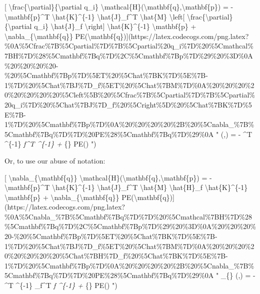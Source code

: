 \documentclass[]{article}
\begin{document}
{[} \textbackslash{}frac\{\textbackslash{}partial\}\{\textbackslash{}partial
q\_i\}
\textbackslash{}mathcal\{H\}(\textbackslash{}mathbf\{q\},\textbackslash{}mathbf\{p\})
= - \textbackslash{}mathbf\{p\}\^{}T \textbackslash{}hat\{K\}\^{}\{-1\}
\textbackslash{}hat\{J\}\_f\^{}T \textbackslash{}hat\{M\}
\textbackslash{}left{[}
\textbackslash{}frac\{\textbackslash{}partial\}\{\textbackslash{}partial q\_i\}
\textbackslash{}hat\{J\}\_f \textbackslash{}right{]}
\textbackslash{}hat\{K\}\^{}\{-1\} \textbackslash{}mathbf\{p\} +
\textbackslash{}nabla\_\{\textbackslash{}mathbf\{q\}\}
PE(\textbackslash{}mathbf\{q\}){]}(https://latex.codecogs.com/png.latex?\%0A\%5Cfrac\%7B\%5Cpartial\%7D\%7B\%5Cpartial\%20q\_i\%7D\%20\%5Cmathcal\%7BH\%7D\%28\%5Cmathbf\%7Bq\%7D\%2C\%5Cmathbf\%7Bp\%7D\%29\%20\%3D\%0A\%20\%20\%20\%20-\%20\%5Cmathbf\%7Bp\%7D\%5ET\%20\%5Chat\%7BK\%7D\%5E\%7B-1\%7D\%20\%5Chat\%7BJ\%7D\_f\%5ET\%20\%5Chat\%7BM\%7D\%0A\%20\%20\%20\%20\%20\%20\%20\%20\%5Cleft\%5B\%20\%5Cfrac\%7B\%5Cpartial\%7D\%7B\%5Cpartial\%20q\_i\%7D\%20\%5Chat\%7BJ\%7D\_f\%20\%5Cright\%5D\%20\%5Chat\%7BK\%7D\%5E\%7B-1\%7D\%20\%5Cmathbf\%7Bp\%7D\%0A\%20\%20\%20\%20\%2B\%20\%5Cnabla\_\%7B\%5Cmathbf\%7Bq\%7D\%7D\%20PE\%28\%5Cmathbf\%7Bq\%7D\%29\%0A
"  (,) = -
\^{}T \^{}\{-1\} \emph{f\^{}T 
 \^{}\{-1\}
 + \nabla}\{\} PE() ")

Or, to use our abuse of notation:

{[} \textbackslash{}nabla\_\{\textbackslash{}mathbf\{q\}\}
\textbackslash{}mathcal\{H\}(\textbackslash{}mathbf\{q\},\textbackslash{}mathbf\{p\})
= - \textbackslash{}mathbf\{p\}\^{}T \textbackslash{}hat\{K\}\^{}\{-1\}
\textbackslash{}hat\{J\}\_f\^{}T \textbackslash{}hat\{M\}
\textbackslash{}hat\{H\}\_f \textbackslash{}hat\{K\}\^{}\{-1\}
\textbackslash{}mathbf\{p\} +
\textbackslash{}nabla\_\{\textbackslash{}mathbf\{q\}\}
PE(\textbackslash{}mathbf\{q\}){]}(https://latex.codecogs.com/png.latex?\%0A\%5Cnabla\_\%7B\%5Cmathbf\%7Bq\%7D\%7D\%20\%5Cmathcal\%7BH\%7D\%28\%5Cmathbf\%7Bq\%7D\%2C\%5Cmathbf\%7Bp\%7D\%29\%20\%3D\%0A\%20\%20\%20\%20-\%20\%5Cmathbf\%7Bp\%7D\%5ET\%20\%5Chat\%7BK\%7D\%5E\%7B-1\%7D\%20\%5Chat\%7BJ\%7D\_f\%5ET\%20\%5Chat\%7BM\%7D\%0A\%20\%20\%20\%20\%20\%20\%20\%20\%5Chat\%7BH\%7D\_f\%20\%5Chat\%7BK\%7D\%5E\%7B-1\%7D\%20\%5Cmathbf\%7Bp\%7D\%0A\%20\%20\%20\%20\%2B\%20\%5Cnabla\_\%7B\%5Cmathbf\%7Bq\%7D\%7D\%20PE\%28\%5Cmathbf\%7Bq\%7D\%29\%0A
" \nabla\_\{\} (,) = - \^{}T
\^{}\{-1\} \_f\^{}T  \emph{f \^{}\{-1\}
 + \nabla}\{\} PE() ")
\end{document}
